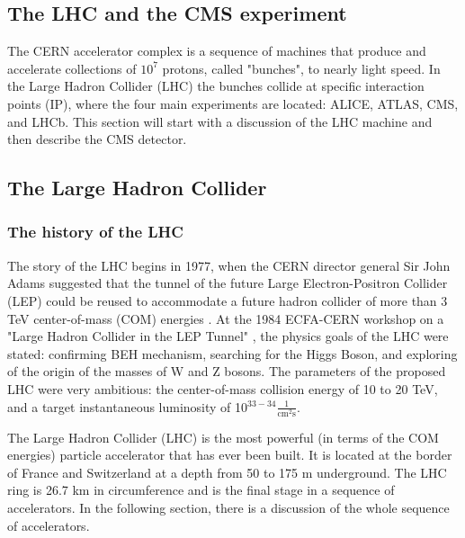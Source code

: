 
\begin{normalsize}



\chapter{The LHC and the CMS experiment}
\label{ch:cms}
The CERN accelerator complex is a sequence of machines that produce and accelerate collections of $10^{7}$ protons, called "bunches", to nearly light speed. In the Large Hadron Collider (LHC) the bunches collide at specific interaction points (IP), where the four main experiments are located: ALICE, ATLAS, CMS, and LHCb. This section will start with a discussion of the LHC machine and then describe the CMS detector. 

\section{The Large Hadron Collider}\label{sec:cms_intro}



\subsection{The history of the LHC}

The story of the LHC begins in 1977, when the CERN director general Sir John Adams suggested that the tunnel of the future Large Electron-Positron Collider (LEP) could be reused to accommodate a future hadron collider of more than 3 TeV center-of-mass (COM) energies \cite{Sadenius}. At the 1984 ECFA-CERN workshop on a "Large Hadron Collider in the LEP Tunnel" \cite{LHC1984}, the physics goals of the LHC were stated: confirming BEH mechanism, searching for the Higgs Boson, and exploring of the origin of the masses of W and Z bosons. The parameters of the proposed LHC were very ambitious: the center-of-mass collision energy of 10 to 20 TeV, and a target instantaneous luminosity of 10$^{33-34}\frac{1}{\textrm{cm}^{2}\textrm{s}}$. 

The Large Hadron Collider (LHC) is the most powerful (in terms of the COM energies) particle accelerator that has ever been built. It is located at the border of France and Switzerland at a depth from 50 to 175 m underground. The LHC ring is 26.7 km in circumference and is the final stage in a sequence of accelerators. In the following section, there is a discussion of the whole sequence of accelerators.



\end{normalsize}
